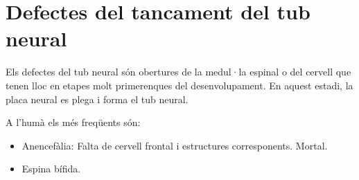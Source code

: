 \section{Defectes del tancament del tub neural}
\label{sec:defect-del-tanc}

Els defectes del tub neural són obertures de la medul·la espinal o del cervell que tenen lloc en etapes molt primerenques del desenvolupament. En aquest estadi, la placa neural es plega i forma el tub neural.

A l'humà els més freqüents són:
\begin{itemize}
\item Anencefàlia: Falta de cervell frontal i estructures corresponents. Mortal.
\item Espina bífida.
\end{itemize}